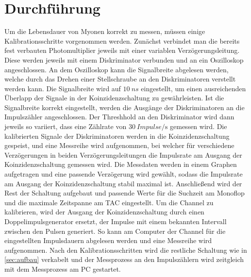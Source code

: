 \section{Durchführung}
\label{sec:Durchführung}
Um die Lebensdauer von Myonen korrekt zu messen, müssen einige Kalibrationsschritte vorgenommen werden. Zunächst verbindet man die bereits fest verbauten Photomultiplier jeweils mit einer variablen Verzögerungsleitung.
Diese werden jeweils mit einem Diskriminator verbunden und an ein Oszilloskop angeschlossen. An dem Oszilloskop kann die Signalbreite abgelesen werden, welche durch das Drehen einer Stellschraube an den Diskriminatoren verstellt werden kann. 
Die Signalbreite wird auf $\SI{10}{ns}$ eingestellt, um einen ausreichenden Überlapp der Signale in der Koinzidenzschaltung zu gewährleisten. Ist die Signalbreite korrekt eingestellt, werden die Ausgänge der Diskriminatoren an die Impulszähler angeschlossen. Der Threshhold an den Diskriminator wird dann jeweils so variiert, dass eine Zählrate von $\SI{30}{Impulse\per\second}$ gemessen wird. 
Die kalibrierten Signale der Diskriminatoren werden in die Koinzidenzschaltung gespeist, und eine Messreihe wird aufgenommen, bei welcher für verschiedene Verzögerungen in beiden Verzögerungsleitungen die Impulsrate am Ausgang der Koinzidenzschaltung gemessen wird. Die Messdaten werden in einem Graphen aufgetragen und eine passende Verzögerung wird gewählt, sodass die Impulsrate am Ausgang der Koinzidenzschaltung stabil maximal ist. 
Anschließend wird der Rest der Schaltung aufgebaut und passende Werte für die Suchzeit am Monoflop und die maximale Zeitspanne am TAC eingestellt. Um die Channel zu kalibrieren, wird der Ausgang der Koinzidenzschaltung durch einen Doppelimpulsgenerator ersetzt, der Impulse mit
einem bekannten Intervall zwischen den Pulsen generiert. So kann am Computer der Channel für die eingestellten Impulsdauern abgelesen werden und eine Messreihe wird aufgenommen. Nach den Kalibrationsschritten wird die restliche Schaltung wie in \autoref{sec:aufbau} verkabelt und der Messprozess an den Impulszählern wird zeitgleich mit dem Messprozess am PC gestartet.

\newpage